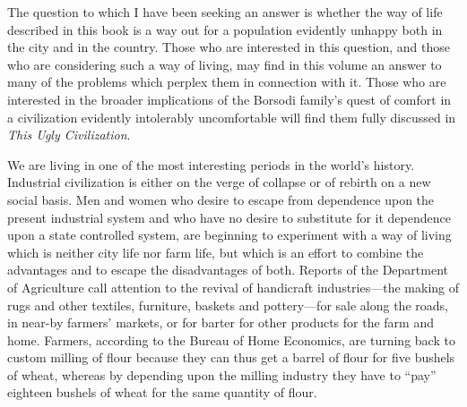 \documentclass{book}
\begin{document}
The question to which I have been seeking an answer is whether the way of life described in this book is a way out for a population evidently unhappy both in the city and in the country. Those who are interested in this question, and those who are considering such a way of living, may find in this volume an answer to many of the problems which perplex them in connection with it. Those who are interested in the broader implications of the Borsodi family’s quest of comfort in a civilization evidently intolerably uncomfortable will find them fully discussed in \emph{This Ugly Civilization}.

We are living in one of the most interesting periods in the world’s history. Industrial civilization is either on the verge of collapse or of rebirth on a new social basis. Men and women who desire to escape from dependence upon the present industrial system and who have no desire to substitute for it dependence upon a state controlled system, are beginning to experiment with a way of living which is neither city life nor farm life, but which is an effort to combine the advantages and to escape the disadvantages of both. Reports of the Department of Agriculture call attention to the revival of handicraft industries—the making of rugs and other textiles, furniture, baskets and pottery—for sale along the roads, in near-by farmers’ markets, or for barter for other products for the farm and home. Farmers, according to the Bureau of Home Economics, are turning back to custom milling of flour because they can thus get a barrel of flour for five bushels of wheat, whereas by depending upon the milling industry they have to “pay” eighteen bushels of wheat for the same quantity of flour.
\end{document}
